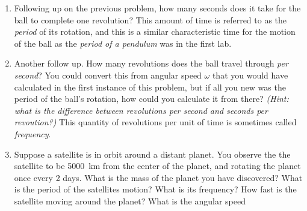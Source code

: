 \begin{enumerate}
\item
Following up on the previous problem, how many seconds does it take for the ball to complete one revolution? This amount of time is referred to as the \emph{period} of its rotation, and this is a similar characteristic time for the motion of the ball as the \emph{period of a pendulum} was in the first lab.\hugeskip

\item 
Another follow up. How many revolutions does the ball travel through \emph{per second}? You could convert this from angular speed $\omega$ that you would have calculated in the first instance of this problem, but if all you new was the period of the ball's rotation, how could you calculate it from there? \emph{(Hint: what is the difference between revolutions per second and seconds per revoution?)} This quantity of revolutions per unit of time is sometimes called \emph{frequency}.\hugeskip

\item 
Suppose a satellite is in orbit around a distant planet. You observe the the satellite to be \SI{5000}{\kilo\meter} from the 
center of the planet, and rotating the planet once every 2 days. What is the mass of the planet you have discovered? What is the period of the satellites motion? What is its frequency? How fast is the satellite moving around the planet? What is the angular speed
\bigskip


\end{enumerate}
